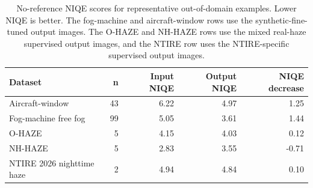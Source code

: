 \documentclass[9pt]{osa-supplemental-document}
\begin{document}
\begin{table}[htbp]
\centering
\small
\caption{No-reference NIQE scores for representative out-of-domain examples. Lower NIQE is better. The fog-machine and aircraft-window rows use the synthetic-fine-tuned output images. The O-HAZE and NH-HAZE rows use the mixed real-haze supervised output images, and the NTIRE row uses the NTIRE-specific supervised output images.}
\label{tabS:niqe_transfer}
\begin{tabular}{lrrrr}
\toprule
\textbf{Dataset} & \textbf{n} & \textbf{Input NIQE} & \textbf{Output NIQE} & \textbf{NIQE decrease} \\
\midrule
Aircraft-window & 43 & 6.22 & 4.97 & 1.25 \\
Fog-machine free fog & 99 & 5.05 & 3.61 & 1.44 \\
O-HAZE & 5 & 4.15 & 4.03 & 0.12 \\
NH-HAZE & 5 & 2.83 & 3.55 & -0.71 \\
NTIRE 2026 nighttime haze & 2 & 4.94 & 4.84 & 0.10 \\
\bottomrule
\end{tabular}
\end{table}
\FloatBarrier


\end{document}
